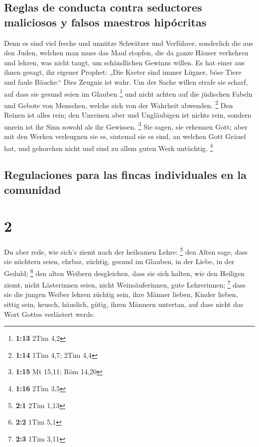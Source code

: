 \hypertarget{reglas-de-conducta-contra-seductores-maliciosos-y-falsos-maestros-hipuxf3critas}{%
\subsection{Reglas de conducta contra seductores maliciosos y falsos
maestros
hipócritas}\label{reglas-de-conducta-contra-seductores-maliciosos-y-falsos-maestros-hipuxf3critas}}

 Denn es sind viel freche und unnütze Schwätzer und
Verführer, sonderlich die aus den Juden,  welchen man
muss das Maul stopfen, die da ganze Häuser verkehren und lehren, was
nicht taugt, um schändlichen Gewinns willen.  Es hat
einer aus ihnen gesagt, ihr eigener Prophet: „Die Kreter sind immer
Lügner, böse Tiere und faule Bäuche.``  Dies Zeugnis ist
wahr. Um der Sache willen strafe sie scharf, auf dass sie gesund seien
im Glauben \footnote{\textbf{1:13} 2Tim 4,2}  und nicht
achten auf die jüdischen Fabeln und Gebote von Menschen, welche sich von
der Wahrheit abwenden. \footnote{\textbf{1:14} 1Tim 4,7; 2Tim 4,4}
 Den Reinen ist alles rein; den Unreinen aber und
Ungläubigen ist nichts rein, sondern unrein ist ihr Sinn sowohl als ihr
Gewissen. \footnote{\textbf{1:15} Mt 15,11; Röm 14,20} 
Sie sagen, sie erkennen Gott; aber mit den Werken verleugnen sie es,
sintemal sie es sind, an welchen Gott Gräuel hat, und gehorchen nicht
und sind zu allem guten Werk untüchtig. \footnote{\textbf{1:16} 2Tim 3,5}

\hypertarget{regulaciones-para-las-fincas-individuales-en-la-comunidad}{%
\subsection{Regulaciones para las fincas individuales en la
comunidad}\label{regulaciones-para-las-fincas-individuales-en-la-comunidad}}

\hypertarget{section-1}{%
\section{2}\label{section-1}}

 Du aber rede, wie sich's ziemt nach der heilsamen Lehre:
\footnote{\textbf{2:1} 2Tim 1,13}  den Alten sage, dass
sie nüchtern seien, ehrbar, züchtig, gesund im Glauben, in der Liebe, in
der Geduld; \footnote{\textbf{2:2} 1Tim 5,1}  den alten
Weibern desgleichen, dass sie sich halten, wie den Heiligen ziemt, nicht
Lästerinnen seien, nicht Weinsäuferinnen, gute Lehrerinnen; \footnote{\textbf{2:3}
  1Tim 3,11}  dass sie die jungen Weiber lehren züchtig
sein, ihre Männer lieben, Kinder lieben,  sittig sein,
keusch, häuslich, gütig, ihren Männern untertan, auf dass nicht das Wort
Gottes verlästert werde.

